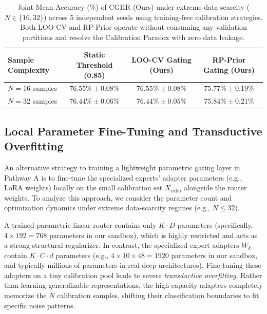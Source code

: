 \documentclass{article}
\theoremstyle{plain}
\theoremstyle{definition}
\theoremstyle{remark}
\begin{document}
\begin{table}[htbp]
\centering
\caption{Joint Mean Accuracy (\%) of CGHR (Ours) under extreme data scarcity ($N \in \{16, 32\}$) across 5 independent seeds using training-free calibration strategies. Both LOO-CV and RP-Prior operate without consuming any validation partitions and resolve the Calibration Paradox with zero data leakage.}
\label{tab:calibration_scarcity_results}
\vskip 0.15in
\begin{tabular}{lccc}
\hline
\textbf{Sample Complexity} & \textbf{Static Threshold (0.85)} & \textbf{LOO-CV Gating (Ours)} & \textbf{RP-Prior Gating (Ours)} \\
\hline
$N=16$ samples & $76.55\% \pm 0.08\%$ & $76.55\% \pm 0.08\%$ & $75.77\% \pm 0.19\%$ \\
$N=32$ samples & $76.44\% \pm 0.06\%$ & $76.44\% \pm 0.05\%$ & $75.84\% \pm 0.21\%$ \\
\hline
\end{tabular}
\end{table}

\subsection{Local Parameter Fine-Tuning and Transductive Overfitting}
\label{app:local_finetuning}
An alternative strategy to training a lightweight parametric gating layer in Pathway A is to fine-tune the specialized experts' adapter parameters (e.g., LoRA weights) locally on the small calibration set $X_{\text{calib}}$ alongside the router weights. To analyze this approach, we consider the parameter count and optimization dynamics under extreme data-scarcity regimes (e.g., $N \le 32$).

A trained parametric linear router contains only $K \cdot D$ parameters (specifically, $4 \times 192 = 768$ parameters in our sandbox), which is highly restricted and acts as a strong structural regularizer. In contrast, the specialized expert adapters $W_k$ contain $K \cdot C \cdot d$ parameters (e.g., $4 \times 10 \times 48 = 1920$ parameters in our sandbox, and typically millions of parameters in real deep architectures). Fine-tuning these adapters on a tiny calibration pool leads to severe \emph{transductive overfitting}. Rather than learning generalizable representations, the high-capacity adapters completely memorize the $N$ calibration samples, shifting their classification boundaries to fit specific noise patterns.
\end{document}
